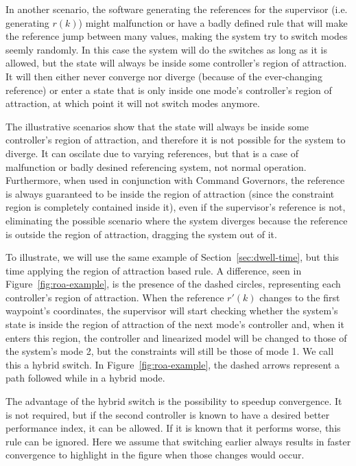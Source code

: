 In another scenario, the software generating the references for the supervisor
(i.e. generating \(r(k)\)) might malfunction or have a badly defined rule that
will make the reference jump between many values, making the system try to
switch modes seemly randomly. In this case the system will do the switches as
long as it is allowed, but the state will always be inside some controller's
region of attraction. It will then either never converge nor diverge (because of
the ever-changing reference) or enter a state that is only inside one mode's
controller's region of attraction, at which point it will not switch modes
anymore.

The illustrative scenarios show that the state will always be inside some
controller's region of attraction, and therefore it is not possible for the
system to diverge. It can oscilate due to varying references, but that is a case
of malfunction or badly desined referencing system, not normal operation.
Furthermore, when used in conjunction with Command Governors, the reference is
always guaranteed to be inside the region of attraction (since the constraint
region is completely contained inside it), even if the supervisor's reference is
not, eliminating the possible scenario where the system diverges because the
reference is outside the region of attraction, dragging the system out of it.

To illustrate, we will use the same example of Section~\ref{sec:dwell-time}, but
this time applying the region of attraction based rule. A difference, seen in
Figure~\ref{fig:roa-example}, is the presence of the dashed circles,
representing each controller's region of attraction. When the reference
\(r'(k)\) changes to the first waypoint's coordinates, the supervisor will start
checking whether the system's state is inside the region of attraction of the
next mode's controller and, when it enters this region, the controller and
linearized model will be changed to those of the system's mode 2, but the
constraints will still be those of mode 1. We call this a hybrid switch. In
Figure~\ref{fig:roa-example}, the dashed arrows represent a path followed while
in a hybrid mode.



The advantage of the hybrid switch is the possibility to speedup convergence. It
is not required, but if the second controller is known to have a desired better
performance index, it can be allowed. If it is known that it performs worse,
this rule can be ignored. Here we assume that switching earlier always results
in faster convergence to highlight in the figure when those changes would occur.

